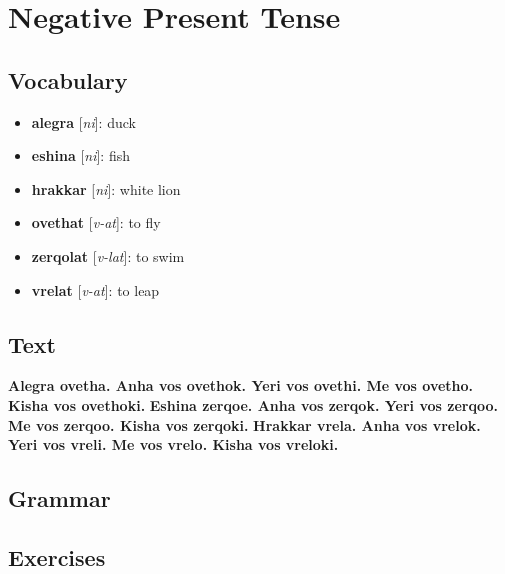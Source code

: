 \chapter{Negative Present Tense}
\section*{Vocabulary}
\begin{itemize}
	\item \textbf{alegra} [\textit{ni}]: duck
	\item \textbf{eshina} [\textit{ni}]: fish
	\item \textbf{hrakkar} [\textit{ni}]: white lion
	\item \textbf{ovethat} [\textit{v-at}]: to fly
	\item \textbf{zerqolat} [\textit{v-lat}]: to swim
	\item \textbf{vrelat} [\textit{v-at}]: to leap
\end{itemize}
\section*{Text}
\textbf{Alegra ovetha. Anha vos ovethok. Yeri vos ovethi. Me vos ovetho. Kisha vos ovethoki.}
\textbf{Eshina zerqoe. Anha vos zerqok. Yeri vos zerqoo. Me vos zerqoo. Kisha vos zerqoki.}
\textbf{Hrakkar vrela. Anha vos vrelok. Yeri vos vreli. Me vos vrelo. Kisha vos vreloki.}
\section*{Grammar}
\section*{Exercises}
